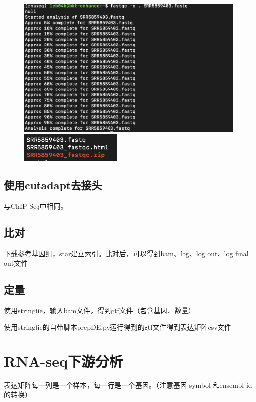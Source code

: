 \begin{figure}[ht]
    \begin{minipage}[C]{0.9\textwidth}
        \centering
        \includegraphics[width=13cm]{image/rnaseq/qc.PNG}
    \end{minipage}

    \begin{minipage}[C]{0.9\textwidth}
        \centering
        \includegraphics[width=5cm]{image/rnaseq/qcfile.PNG}
    \end{minipage}
\end{figure}

\subsection{使用cutadapt去接头}
与ChIP-Seq中相同。

\subsection{比对}
下载参考基因组，star建立索引。比对后，可以得到bam、log、log out、log final out文件

\subsection{定量}
使用stringtie，输入bam文件，得到gtf文件（包含基因、数量）

使用stringtie的自带脚本prepDE.py运行得到的gtf文件得到表达矩阵csv文件

\section{RNA-seq下游分析}
表达矩阵每一列是一个样本，每一行是一个基因。（注意基因 symbol 和ensembl id 的转换）

